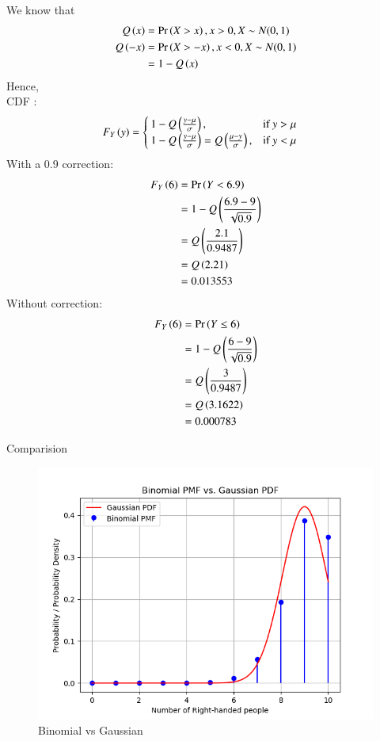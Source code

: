 \documentclass[journal,12pt,onecolumn]{IEEEtran}
\begin{document}
We know that 
\begin{align}
Q\left(x\right) &= \Pr\left(X > x\right), x > 0, X \sim N(0,1)\\
Q\left(-x\right) &= \Pr\left(X > -x\right), x < 0, X \sim N(0,1)\\
&= 1 - Q\left(x\right)
\end{align}
Hence,\\
CDF :
\begin{align}
F_Y\left(y\right) &= \begin{cases}
                 1 - Q\left(\frac{y - \mu}{\sigma}\right),& \text{if $y > \mu$}\\
                 1 - Q\left(\frac{y - \mu}{\sigma}\right) = Q\left(\frac{\mu - y}{\sigma}\right),& \text{if $y < \mu$}
               \end{cases}
\end{align}
With a 0.9 correction:
\begin{align}
F_Y\left(6\right) &= \Pr\left(Y < 6.9\right)\\
&= 1 - Q\left(\frac{6.9 - 9}{\sqrt{0.9}}\right)\\
&= Q\left(\frac{2.1}{0.9487}\right)\\
&= Q\left(2.21\right)\\
&= 0.013553
\end{align}
Without correction:
\begin{align}
F_Y\left(6\right) &= \Pr\left(Y \leq 6\right)\\
&= 1 - Q\left(\frac{6 - 9}{\sqrt{0.9}}\right)\\
&= Q\left(\frac{3}{0.9487}\right)\\
&= Q\left(3.1622\right)\\
&= 0.000783
\end{align}
\begin{table}[H]
        \caption{Comparision}
        \label{tab:ncert/9/3/16/}
        \centering
        
\end{table}
\begin{figure}[H]
\centering
\includegraphics[width=\columnwidth]{./ncert/9/3/16/figs/fig.png}
\caption{Binomial vs Gaussian}
\label{fig:BvG_py}
\end{figure}
\end{document}
